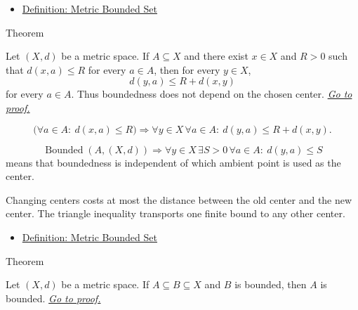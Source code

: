 \begin{dependencies}
\begin{itemize}
  \item \hyperref[def:metric-bounded-set]{Definition: Metric Bounded Set}
\end{itemize}
\end{dependencies}

\begin{theorembox}{Theorem}
\begin{theorem}\label{thm:metric-bounded-center-independence}
Let \((X,d)\) be a metric space.  If \(A\subseteq X\) and there exist
\(x\in X\) and \(R>0\) such that \(d(x,a)\leq R\) for every \(a\in A\), then
for every \(y\in X\),
\[
  d(y,a)\leq R+d(x,y)
\]
for every \(a\in A\).  Thus boundedness does not depend on the chosen center.
\hyperref[prf:metric-bounded-center-independence]{\textit{Go to proof.}}
\end{theorem}
\end{theorembox}

\begin{remark*}
\[
\bigl(\forall a\in A{:}\ d(x,a)\leq R\bigr)
\Longrightarrow
\forall y\in X\,\forall a\in A{:}\ d(y,a)\leq R+d(x,y).
\]
\end{remark*}

\begin{remark*}
\[
\operatorname{Bounded}(A,(X,d))
\Longrightarrow
\forall y\in X\,\exists S>0\,\forall a\in A{:}\ d(y,a)\leq S
\]
means that boundedness is independent of which ambient point is used as the
center.
\end{remark*}

\begin{remark*}[Interpretation]
Changing centers costs at most the distance between the old center and the
new center.  The triangle inequality transports one finite bound to any other
center.
\end{remark*}

\begin{dependencies}
\begin{itemize}
  \item \hyperref[def:metric-bounded-set]{Definition: Metric Bounded Set}
\end{itemize}
\end{dependencies}

\begin{theorembox}{Theorem}
\begin{theorem}
\label{thm:metric-subsets-bounded-sets-bounded}
Let \((X,d)\) be a metric space.  If \(A\subseteq B\subseteq X\) and \(B\) is
bounded, then \(A\) is bounded.
\hyperref[prf:metric-subsets-bounded-sets-bounded]{\textit{Go to proof.}}
\end{theorem}
\end{theorembox}


